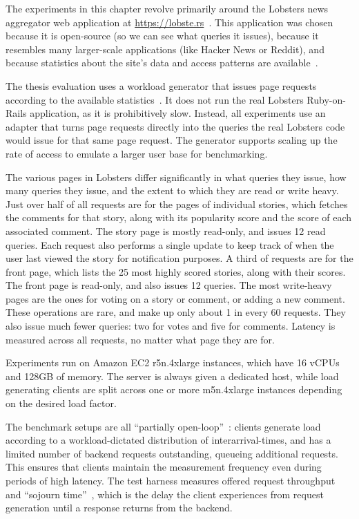 The experiments in this chapter revolve primarily around the Lobsters news
aggregator web application at \url{https://lobste.rs}~\cite{lobsters}. This
application was chosen because it is open-source (so we can see what queries it
issues), because it resembles many larger-scale applications (like Hacker News
or Reddit), and because statistics about the site's data and access patterns are
available~\cite{lobsters-data}.

The thesis evaluation uses a workload generator that issues page requests
according to the available statistics~\cite{generator}. It does not run the
real Lobsters Ruby-on-Rails application, as it is prohibitively slow. Instead,
all experiments use an adapter that turns page requests directly into the
queries the real Lobsters code would issue for that same page request. The
generator supports scaling up the rate of access to emulate a larger user base
for benchmarking.

The various pages in Lobsters differ significantly in what queries they issue,
how many queries they issue, and the extent to which they are read or write
heavy. Just over half of all requests are for the pages of individual stories,
which fetches the comments for that story, along with its popularity score and
the score of each associated comment. The story page is mostly read-only, and
issues 12 read queries. Each request also performs a single update to keep track
of when the user last viewed the story for notification purposes. A third of
requests are for the front page, which lists the 25 most highly scored stories,
along with their scores. The front page is read-only, and also issues 12
queries. The most write-heavy pages are the ones for voting on a story or
comment, or adding a new comment. These operations are rare, and make up only
about 1 in every 60 requests. They also issue much fewer queries: two for votes
and five for comments. Latency is measured across all requests, no matter what
page they are for.

Experiments run on Amazon EC2 r5n.4xlarge instances, which have 16 vCPUs and
128GB of memory. The server is always given a dedicated host, while load
generating clients are split across one or more m5n.4xlarge instances depending
on the desired load factor.

The benchmark setups are all ``partially open-loop''~\cite{frank-open-loop}:
clients generate load according to a workload-dictated distribution of
interarrival-times, and has a limited number of backend requests outstanding,
queueing additional requests. This ensures that clients maintain the measurement
frequency even during periods of high latency. The test harness measures offered
request throughput and ``sojourn time''~\cite{open-loop-cautionary-tale}, which
is the delay the client experiences from request generation until a response
returns from the backend.

